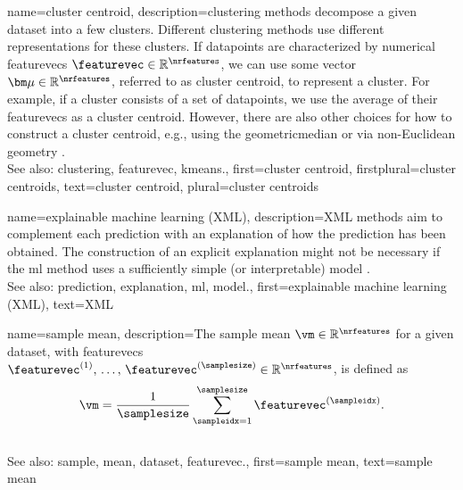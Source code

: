 {name={cluster centroid}, 
	description={\Gls{clustering} methods decompose a given 
		\gls{dataset} into a few \glspl{cluster}. Different \gls{clustering} methods use 
		different representations for these \glspl{cluster}. If \glspl{datapoint} are 
		characterized by numerical \glspl{featurevec} $\featurevec \in \mathbb{R}^{\nrfeatures}$, 
		we can use some \gls{vector} ${\bm \mu} \in \mathbb{R}^{\nrfeatures}$, referred to 
		as \gls{cluster} centroid, to represent a \gls{cluster}. For example, if a \gls{cluster} 
		consists of a set of \glspl{datapoint}, we use the average of their \glspl{featurevec} 
		as a \gls{cluster} centroid. However, there are also other choices for how to construct 
		a \gls{cluster} centroid, e.g., using the \gls{geometricmedian} \cite{PARK20093336} 
		or via non-Euclidean geometry \cite{JMLR:v6:banerjee05b}.
		\\
		See also: \gls{clustering}, \gls{featurevec}, \gls{kmeans}.},
	first={cluster centroid},
	firstplural={cluster centroids}, 
	text={cluster centroid}, 
	plural={cluster centroids}
}

{name={explainable machine learning (XML)}, 
	description={XML 
		methods aim to complement each \gls{prediction} with an \gls{explanation} of 
		how the \gls{prediction} has been obtained. The construction of an explicit \gls{explanation} 
		might not be necessary if the \gls{ml} method uses a sufficiently simple (or interpretable) \gls{model} \cite{rudin2019stop}.
				\\
		See also: \gls{prediction}, \gls{explanation}, \gls{ml}, \gls{model}.},
	first={explainable machine learning (XML)},
	text={XML} 
}
	
{name={sample mean}, 
	description={The \gls{sample} \gls{mean} 
		$\vm \in \mathbb{R}^{\nrfeatures}$ for a given \gls{dataset}, with \glspl{featurevec} 
		$\featurevec^{(1)}, \,\ldots, \,\featurevec^{(\samplesize)} \in \mathbb{R}^{\nrfeatures}$, is defined as 
		$$\vm = \frac{1}{\samplesize} \sum_{\sampleidx=1}^{\samplesize} \featurevec^{(\sampleidx)}.$$ 
					\\
		See also: \gls{sample}, \gls{mean}, \gls{dataset}, \gls{featurevec}.},
	first={sample mean},
	text={sample mean} 
}
	
